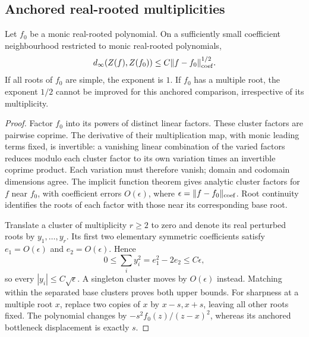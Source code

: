 \subsection{Anchored real-rooted multiplicities}
\begin{lemma}
\label{lem:anchored-real-roots}
Let $f_0$ be a monic real-rooted polynomial. On a sufficiently small
coefficient neighbourhood restricted to monic real-rooted polynomials,
\[
 d_\infty(Z(f),Z(f_0))\le C\|f-f_0\|_{\rm coef}^{1/2}.
\]
If all roots of $f_0$ are simple, the exponent is $1$. If $f_0$ has a
multiple root, the exponent $1/2$ cannot be improved for this anchored
comparison, irrespective of its multiplicity.
\end{lemma}
\begin{proof}
Factor $f_0$ into its powers of distinct linear factors. These cluster
factors are pairwise coprime. The derivative of their multiplication
map, with monic leading terms fixed, is invertible: a vanishing linear
combination of the varied factors reduces modulo each cluster factor
to its own variation times an invertible coprime product. Each variation
must therefore vanish; domain and codomain dimensions agree. The
implicit function theorem gives analytic cluster factors for $f$
near $f_0$, with coefficient errors $O(\epsilon)$, where
$\epsilon=\|f-f_0\|_{\rm coef}$. Root continuity identifies the roots
of each factor with those near its corresponding base root.

Translate a cluster of multiplicity $r\ge2$ to zero and denote its
real perturbed roots by $y_1,\ldots,y_r$. Its first two elementary
symmetric coefficients satisfy $e_1=O(\epsilon)$ and
$e_2=O(\epsilon)$. Hence
\[
 0\le\sum_i y_i^2=e_1^2-2e_2\le C\epsilon,
\]
so every $|y_i|\le C\sqrt\epsilon$. A singleton cluster moves by
$O(\epsilon)$ instead. Matching within the separated base clusters
proves both upper bounds. For sharpness at a multiple root $x$, replace
two copies of $x$ by $x-s,x+s$, leaving all other roots fixed. The
polynomial changes by $-s^2 f_0(z)/(z-x)^2$, whereas its anchored
bottleneck displacement is exactly $s$.
\end{proof}

